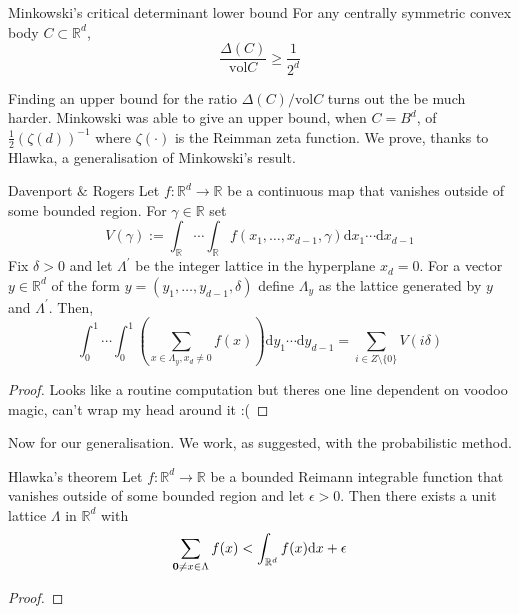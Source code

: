 \documentclass{article}
\begin{document}
\begin{theorem}[]{Minkowski's critical determinant lower bound}
    For any centrally symmetric convex body $C \subset \mathbb{R}^d$, 
    \[\frac{\Delta(C)}{\text{vol}C} \geq \frac{1}{2^d}\]
\end{theorem}

Finding an upper bound for the ratio $\Delta(C)/\text{vol}C$ turns out the be much harder. Minkowski was able to 
give an upper bound, when $C = B^d$, of $\frac{1}{2}(\zeta(d))^{-1}$ where $\zeta(\cdot)$ is the Reimman zeta function.
We prove, thanks to Hlawka, a generalisation of Minkowski's result. 

\begin{lemma}[]{Davenport $\&$ Rogers}
    Let $f:\mathbb{R}^d \to \mathbb{R}$ be a continuous map that vanishes outside of some bounded region. For $\gamma
    \in \mathbb{R}$ set \[V(\gamma) := \int_{\mathbb{R}}\cdots\int_{\mathbb{R}}f(x_1, \dots, x_{d-1}, \gamma)\mathrm{d}x_1 \cdots \mathrm{d}x_{d-1}\] 
    Fix $\delta > 0$ and let $\Lambda^\prime$ be the integer lattice in the hyperplane $x_d = 0$. For a vector $y \in \mathbb{R}^d$ 
    of the form $y = (y_1, \dots, y_{d-1}, \delta)$ define $\Lambda_y$ as the lattice generated by $y$ and $\Lambda^\prime$. 
    Then, \[\int_{0}^1 \cdots \int_{0}^1 \left(\sum_{x \in \Lambda_y, x_d \neq 0}f(x)\right)\mathrm{d}y_1 \cdots \mathrm{d}y_{d-1} 
    = \sum_{i \in Z\setminus \{0\}}V(i \delta)\]
\end{lemma}

\begin{proof}
    Looks like a routine computation but theres one line dependent on voodoo magic, can't wrap my head around it :(
\end{proof}

Now for our generalisation. We work, as suggested, with the probabilistic method. 

\begin{theorem}[]{Hlawka's theorem}
    Let $f: \mathbb{R}^d \to \mathbb{R}$ be a bounded Reimann integrable function that vanishes outside of some bounded
    region and let $\epsilon > 0$. Then there exists a unit lattice $\Lambda$ in $\mathbb{R}^d$ with 
    \[\sum_{{\bf 0} \neq x \in \Lambda}f(x) < \int_{\mathbb{R}^d}f(x)\mathrm{d}x + \epsilon\]
\end{theorem} 

\begin{proof}

\end{proof}
\end{document}
